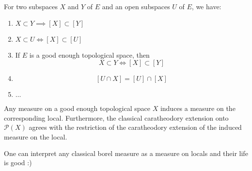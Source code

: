 \begin{proposition}
    \label{prop:subset_to_sublocal_structure}
    For two subspaces $X$ and $Y$ of $E$ and an open subspaces $U$ of $E$, we have:
    \begin{enumerate}
        \item $X \subset Y \implies [X] \subset [Y]$
        \item $X \subset U \iff [X] \subset [U]$
        \item If $E$ is a good enough topological space, then \[X \subset Y \iff [X] \subset [Y]\]
        \item \[[U \cap X] = [U] \cap [X]\]
        \item $\dots$
    \end{enumerate}

\end{proposition}

\begin{theorem}
    \label{thm:measure_top_to_loc}
    Any measure on a good enough topological space $X$ induces a measure on the corresponding local. Furthermore, the classical caratheodory extension onto $\mathcal{P}(X)$ agrees with the restriction of the caratheodory extension of the induced measure on the local.
\end{theorem}

\begin{theorem}[Goal]
    \label{thm:goal}
    One can interpret any classical borel measure as a measure on locals and their life is good :)
\end{theorem}




